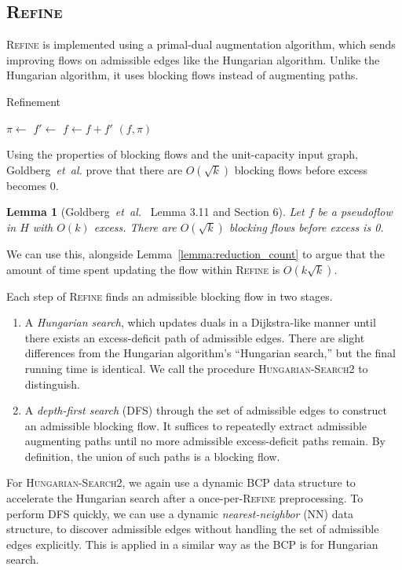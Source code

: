 \documentclass[11pt]{article}
\def\etal{\textsl{et~al.}}
\theoremstyle{plain}
\newtheorem{lemma}{Lemma}
\begin{document}
\subsection{\textsc{Refine}}

\textsc{Refine} is implemented using a primal-dual augmentation algorithm, 
which sends improving flows on admissible edges like the Hungarian algorithm.
Unlike the Hungarian algorithm, it uses blocking flows instead of augmenting 
paths.

\begin{algorithm}
\caption{Refinement}
\begin{algorithmic}[1]
		\State $\pi \gets$ 
		\State $f' \gets$ 
		\State $f \gets f + f'$
	\EndWhile
	\State\Return $(f, \pi)$
\EndFunction
\end{algorithmic}
\end{algorithm}

Using the properties of blocking flows and the unit-capacity input graph, 
Goldberg~{\etal} prove that there are $O(\sqrt{k})$ blocking flows before 
excess becomes 0.

\begin{lemma}[Goldberg~{\etal}~\cite{GHKT17} Lemma 3.11 and Section 6]
	Let $f$ be a pseudoflow in $H$ with $O(k)$ excess. 
	There are $O(\sqrt{k})$ blocking flows before excess is 0.
\end{lemma}

We can use this, alongside Lemma~\ref{lemma:reduction_count} to argue that the
amount of time spent updating the flow within \textsc{Refine} is 
$O(k\sqrt{k})$.

Each step of \textsc{Refine} finds an admissible blocking flow in two stages.
\begin{enumerate}
\item A \emph{Hungarian search}, which updates duals in a Dijkstra-like 
	manner until there exists an excess-deficit path of admissible edges.
	There are slight differences from the Hungarian algorithm's ``Hungarian 
	search,'' but the final running time is identical.
	We call the procedure \textsc{Hungarian-Search2} to distinguish.

\item A \emph{depth-first search} (\textsc{DFS}) through the set of admissible 
	edges to construct an admissible blocking flow.
	It suffices to repeatedly extract admissible augmenting paths until
	no more admissible excess-deficit paths remain.
	By definition, the union of such paths is a blocking flow.
\end{enumerate}
For \textsc{Hungarian-Search2}, we again use a dynamic BCP data structure to 
accelerate the Hungarian search after a once-per-\textsc{Refine} preprocessing.
To perform \textsc{DFS} quickly, we can use a dynamic \emph{nearest-neighbor} 
(NN) data structure, to discover admissible edges without handling the set of 
admissible edges explicitly. 
This is applied in a similar way as the BCP is for Hungarian search.
\end{document}
